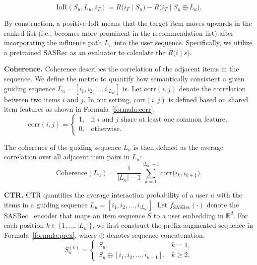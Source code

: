 \begin{equation}
\mathrm{IoR}(S_u, L_u, i_T)
=
R\bigl(i_T \mid S_u\bigr) - R\bigl(i_T \mid S_u \oplus L_u\bigr)
.
\end{equation}

By construction, a positive IoR means that the target item moves
upwards in the ranked list (i.e., becomes more prominent in the
recommendation list) after incorporating the influence path $L_u$
into the user sequence. Specifically, we utilize a pretrained SASRec as an evaluator to calculate the $R\bigl(i \mid s\bigr)$.

\textbf{Coherence.} Coherence describes the correlation of the adjacent items in the sequence. We define the metric to quantify how semantically consistent a given guiding sequence $L_u = [i_1, i_2, \dots, i_{|L_u|}]$ is. Let $\mathrm{corr}(i,j)$ denote the correlation between two items
$i$ and $j$. In our setting, $\mathrm{corr}(i,j)$ is defined based on shared item features as shown in Formula~\ref{formula:corr}.
\begin{equation}
\mathrm{corr}(i,j) =
\begin{cases}
\label{formula:corr}
1, & \text{if $i$ and $j$ share at least one common feature,} \\
0, & \text{otherwise.}
\end{cases}
\end{equation}

The coherence of the guiding sequence $L_u$ is then defined as the average correlation
over all adjacent item pairs in $L_u$:
\begin{equation}
\mathrm{Coherence}(L_u)
=
\frac{1}{|L_u|-1}
\sum_{k=1}^{|L_u|-1}
\mathrm{corr}\bigl(i_k, i_{k+1}\bigr).
\end{equation}

\textbf{CTR.} CTR quantifies the average interaction probability of a user $u$ with the items in a guiding sequence $L_u = [i_1, i_2, \dots, i_{|L_u|}]$. Let $f_{\mathrm{SASRec}}(\cdot)$ denote the SASRec~\cite{kang2018self} encoder that maps an item sequence $S$ to a user embedding in $\mathbb{R}^d$. For each position $k \in \{1,\dots,|L_u|\}$, we first construct the prefix-augmented sequence in Formula~\ref{formula:prex}, where $\oplus$ denotes sequence concatenation.
\begin{equation}
\label{formula:prex}
S_u^{(k)} =
\begin{cases}
S_u, & k = 1,\\[2pt]
S_u \oplus [i_1, i_2, \dots, i_{k-1}], & k \ge 2,
\end{cases}
\end{equation}

